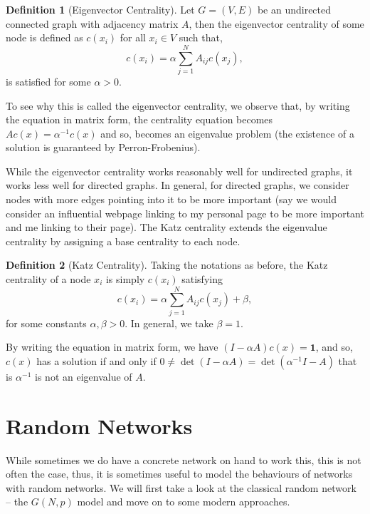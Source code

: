 \documentclass[
]{article}
\theoremstyle{definition}
\theoremstyle{definition}
\newtheorem{definition}{Definition}[section]
\begin{document}
\begin{definition}[Eigenvector Centrality]
  Let \(G = (V, E)\) be an undirected connected graph with adjacency matrix \(A\), 
  then the eigenvector centrality of some node is defined as \(c(x_i)\) for all 
  \(x_i \in V\) such that,
  \[c(x_i) = \alpha \sum_{j = 1}^N A_{ij} c(x_j),\]
  is satisfied for some \(\alpha > 0\). 
\end{definition}

To see why this is called the eigenvector centrality, we observe that,
by writing the equation in matrix form, the centrality equation becomes
\(Ac(x) = \alpha^{-1}c(x)\) and so, becomes an eigenvalue problem (the
existence of a solution is guaranteed by Perron-Frobenius).

While the eigenvector centrality works reasonably well for undirected
graphs, it works less well for directed graphs. In general, for directed
graphs, we consider nodes with more edges pointing into it to be more
important (say we would consider an influential webpage linking to my
personal page to be more important and me linking to their page). The
Katz centrality extends the eigenvalue centrality by assigning a base
centrality to each node.

\begin{definition}[Katz Centrality]
  Taking the notations as before, the Katz centrality of a node \(x_i\) is 
  simply \(c(x_i)\) satisfying 
  \[c(x_i) = \alpha \sum_{j = 1}^N A_{ij} c(x_j) + \beta,\]
  for some constants \(\alpha, \beta > 0\). In general, we take \(\beta = 1\).
\end{definition}

By writing the equation in matrix form, we have
\((I - \alpha A) c(x) = \mathbf{1}\), and so, \(c(x)\) has a solution if
and only if \(0 \neq \det(I - \alpha A) = \det(\alpha^{-1} I - A)\) that
is \(\alpha^{-1}\) is not an eigenvalue of \(A\).

\newpage

\hypertarget{random-networks}{%
\section{Random Networks}\label{random-networks}}

While sometimes we do have a concrete network on hand to work this, this
is not often the case, thus, it is sometimes useful to model the
behaviours of networks with random networks. We will first take a look
at the classical random network -- the \(G(N, p)\) model and move on to
some modern approaches.
\end{document}
